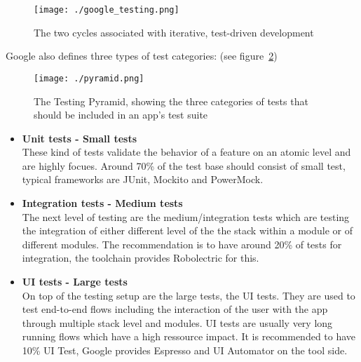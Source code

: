 \begin{figure}[h]
	\centering
	\texttt{[image: ./google\_testing.png]}
	\caption[The two cycles associated with iterative, test-driven development]{The two cycles associated with iterative, test-driven development\footnotemark}
	\label{fig_google_testing}
\end{figure}

Google also defines three types of test categories: (see figure~\ref{fig_google_pyramid})

\begin{figure}[htb]
	\centering
	\texttt{[image: ./pyramid.png]}
	\caption[The Testing Pyramid, showing the three categories of tests that should be included in an app's test suite]{The Testing Pyramid, showing the three categories of tests that should be included in an app's test suite\footnotemark}
	\label{fig_google_pyramid}
\end{figure}

\begin{itemize}
	\item \textbf{Unit tests - Small tests} \\ 
	These kind of tests validate the behavior of a feature on an atomic level and are highly focues. Around 70\% of the test base should consist of small test, typical frameworks are JUnit, Mockito and PowerMock.
	
	\item \textbf{Integration tests - Medium tests} \\ 
	The next level of testing are the medium/integration tests which are testing the integration of either different level of the the stack within a module or of different modules. The recommendation is to have around 20\% of tests for integration, the toolchain provides Robolectric for this.
	
	\item \textbf{UI tests - Large tests} \\ 
	On top of the testing setup are the large tests, the UI tests. They are used to test end-to-end flows including the interaction of the user with the app through multiple stack level and modules. UI tests are usually very long running flows which have a high ressource impact. It is recommended to have 10\% UI Test, Google provides Espresso and UI Automator on the tool side.
\end{itemize}


